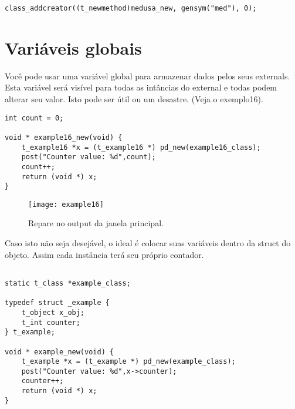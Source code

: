 \begin{lstlisting}
class_addcreator((t_newmethod)medusa_new, gensym("med"), 0);
\end{lstlisting}

\section{Variáveis globais}

Você pode usar uma variável global para armazenar dados pelos seus externals.
Esta variável será visível para todas as intâncias do external e todas podem
alterar seu valor. Isto pode ser útil ou um desastre. (Veja o exemplo16).

\begin{lstlisting}
int count = 0;

void * example16_new(void) {
    t_example16 *x = (t_example16 *) pd_new(example16_class);
    post("Counter value: %d",count);
    count++;
    return (void *) x;
}
\end{lstlisting}

\begin{figure}[h!]
	\centering
	\texttt{[image: example16]}
	\caption{Repare no output da janela principal.}
\end{figure}

Caso isto não seja desejável, o ideal é colocar suas variáveis dentro da
struct do objeto. Assim cada instância terá seu próprio contador.

\begin{lstlisting}

static t_class *example_class;

typedef struct _example {
    t_object x_obj;
    t_int counter;
} t_example;

void * example_new(void) {
    t_example *x = (t_example *) pd_new(example_class);
    post("Counter value: %d",x->counter);
    counter++;
    return (void *) x;
}

\end{lstlisting}

